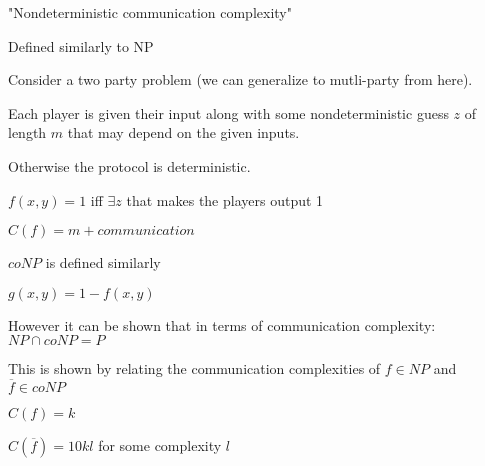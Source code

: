 \documentclass[12pt]{article}
\begin{document}
\maketitle

\par{"Nondeterministic communication complexity"}
\\

\par{Defined similarly to NP}
\\

\par{Consider a two party problem (we can generalize to mutli-party from here).}
\\

\par{Each player is given their input along with some nondeterministic guess $z$ of length $m$ that may depend on the
given inputs.}
\\

\par{Otherwise the protocol is deterministic.}
\\

\par{$f(x, y) = 1$ iff $\exists z$ that makes the players output 1}
\\

\par{$C(f) = m + communication$}
\\


\par{$coNP$ is defined similarly}
\\

\par{$g(x, y) = 1 - f(x, y)$}
\\

\par{However it can be shown that in terms of communication complexity: $NP \cap coNP = P$}
\\

\par{This is shown by relating the communication complexities of $f \in NP$ and $\overline{f} \in coNP$}
\par{$C(f) = k$}
\par{$C(\overline{f}) = 10kl$ for some complexity $l$}
\end{document}
